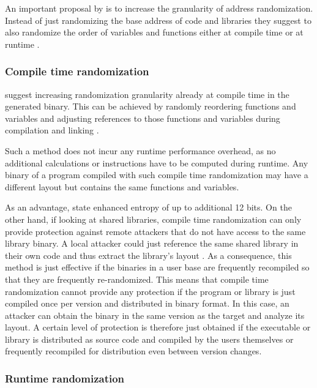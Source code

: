 An important proposal by \citeauthor{Shacham2004} is to increase the granularity of address randomization.
Instead of just randomizing the base address of code and libraries they suggest to also randomize the order of variables and functions either at compile time or at runtime \cite[303\psq]{Shacham2004}.

\subsubsection{Compile time randomization}
\label{subsubsec:randomization-granularity-compile-time}

 suggest increasing randomization granularity already at compile time in the generated binary.
This can be achieved by randomly reordering functions and variables and adjusting references to those functions and variables during compilation and linking \cite[304]{Shacham2004}.

Such a method does not incur any runtime performance overhead, as no additional calculations or instructions have to be computed during runtime.
Any binary of a program compiled with such compile time randomization may have a different layout but contains the same functions and variables.

As an advantage, \citeauthor{Shacham2004} state enhanced entropy of up to additional 12 bits.
On the other hand, if looking at shared libraries, compile time randomization can only provide protection against remote attackers that do not have access to the same library binary.
A local attacker could just reference the same shared library in their own code and thus extract the library's layout \cite[304]{Shacham2004}.
As a consequence, this method is just effective if the binaries in a user base are frequently recompiled so that they are frequently re-randomized.
This means that compile time randomization cannot provide any protection if the program or library is just compiled once per version and distributed in binary format.
In this case, an attacker can obtain the binary in the same version as the target and analyze its layout.
A certain level of protection is therefore just obtained if the executable or library is distributed as source code and compiled by the users themselves or frequently recompiled for distribution even between version changes.

\subsubsection{Runtime randomization}
\label{subsubsec:randomization-granularity-runtime}


